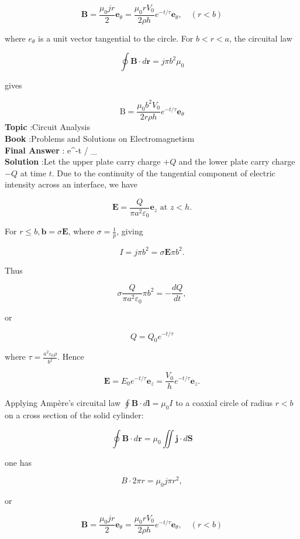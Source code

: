 \documentclass[10pt]{article}
\begin{document}
$$
\mathbf{B}=\frac{\mu_{0} j r}{2} \mathbf{e}_{\theta}=\frac{\mu_{0} r V_{0}}{2 \rho h} e^{-t / \tau} \mathbf{e}_{\theta}, \quad(r<b)
$$

where $e_{\theta}$ is a unit vector tangential to the circle. For $b<r<a$, the circuital law

$$
\oint \mathbf{B} \cdot d \mathbf{r}=j \pi b^{2} \mu_{0}
$$

gives

$$
\mathrm{B}=\frac{\mu_{0} b^{2} V_{0}}{2 r \rho h} e^{-t / \tau} \mathbf{e}_{\theta}
$$
\textbf{Topic} :Circuit Analysis\\
\textbf{Book} :Problems and Solutions on Electromagnetism\\
\textbf{Final Answer} : e^{-t / \tau} _{\theta}\\


\textbf{Solution} :Let the upper plate carry charge $+Q$ and the lower plate carry charge $-Q$ at time $t$. Due to the continuity of the tangential component of electric intensity across an interface, we have

$$
\mathbf{E}=\frac{Q}{\pi a^{2} \varepsilon_{0}} \mathbf{e}_{z} \text { at } z<h .
$$

For $r \leq b, \mathbf{b}=\sigma \mathbf{E}$, where $\sigma=\frac{1}{p}$, giving

$$
I=j \pi b^{2}=\sigma \mathbf{E} \pi b^{2} .
$$

Thus

$$
\sigma \frac{Q}{\pi a^{2} \varepsilon_{0}} \pi b^{2}=-\frac{d Q}{d t},
$$

or

$$
Q=Q_{0} e^{-t / \tau}
$$

where $\tau=\frac{a^{2} \varepsilon_{0} \rho}{b^{2}}$. Hence

$$
\mathbf{E}=E_{0} e^{-t / \tau} \mathbf{e}_{z}=\frac{V_{0}}{h} e^{-t / \tau} \mathbf{e}_{z} .
$$

 Applying Ampère's circuital law $\oint \mathbf{B} \cdot d \mathbf{l}=\mu_{0} I$ to a coaxial circle of radius $r<b$ on a cross section of the solid cylinder:

$$
\oint \mathbf{B} \cdot d \mathbf{r}=\mu_{0} \iint \mathbf{j} \cdot d \mathbf{S}
$$

one has

$$
B \cdot 2 \pi r=\mu_{0} j \pi r^{2},
$$

or

$$
\mathbf{B}=\frac{\mu_{0} j r}{2} \mathbf{e}_{\theta}=\frac{\mu_{0} r V_{0}}{2 \rho h} e^{-t / \tau} \mathbf{e}_{\theta}, \quad(r<b)
$$
\end{document}
